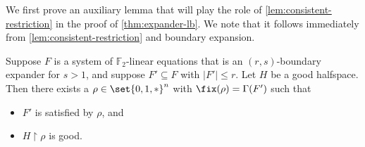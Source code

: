 \documentclass{toc}
\begin{document}
We first prove an auxiliary lemma that will play the role of \autoref{lem:consistent-restriction} in the proof of \autoref{thm:expander-lb}.
We note that it follows immediately from \autoref{lem:consistent-restriction} and boundary expansion.
\begin{lemma}\label{lem:boundary-cleanup}
	Suppose $F$ is a system of $\mathbb{F}_2$-linear equations that is an $(r, s)$-boundary expander for $s > 1$, and suppose $F' \subseteq F$ with $|F'| \leq r$.
	Let $H$ be a good halfspace.
	Then there exists a $\rho \in \set{0,1,*}^n$ with $\fix(\rho) = \Gamma(F')$ such that 
	\begin{itemize}
		\item $F'$ is satisfied by $\rho$, and
		\item $H \restriction \rho$ is good.
	\end{itemize}
\end{lemma}
\end{document}
